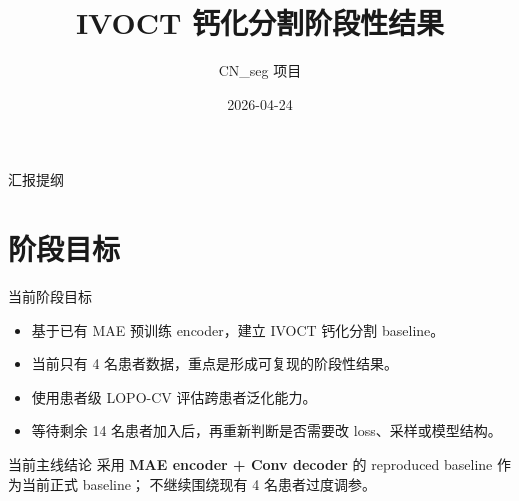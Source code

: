 \documentclass[
  presentation,
  titlegraphic=./images/bit_logo.pdf,
  framelogo=./images/bit_logo.pdf
]{bitbeamer}
\title{IVOCT 钙化分割阶段性结果}
\author{CN\_seg 项目}
\institute{北京理工大学}
\date{2026-04-24}
\begin{document}
\frame{\titlepage}

\begin{frame}{汇报提纲}
  \tableofcontents[hideallsubsections]
\end{frame}


\section{阶段目标}

\begin{frame}[t]{当前阶段目标}
  \begin{itemize}
    \item 基于已有 MAE 预训练 encoder，建立 IVOCT 钙化分割 baseline。
    \item 当前只有 4 名患者数据，重点是形成可复现的阶段性结果。
    \item 使用患者级 LOPO-CV 评估跨患者泛化能力。
    \item 等待剩余 14 名患者加入后，再重新判断是否需要改 loss、采样或模型结构。
  \end{itemize}

  \vspace{0.5cm}

  \begin{block}{当前主线结论}
    采用 \textbf{MAE encoder + Conv decoder} 的 reproduced baseline 作为当前正式 baseline；
    不继续围绕现有 4 名患者过度调参。
  \end{block}
\end{frame}
\end{document}

